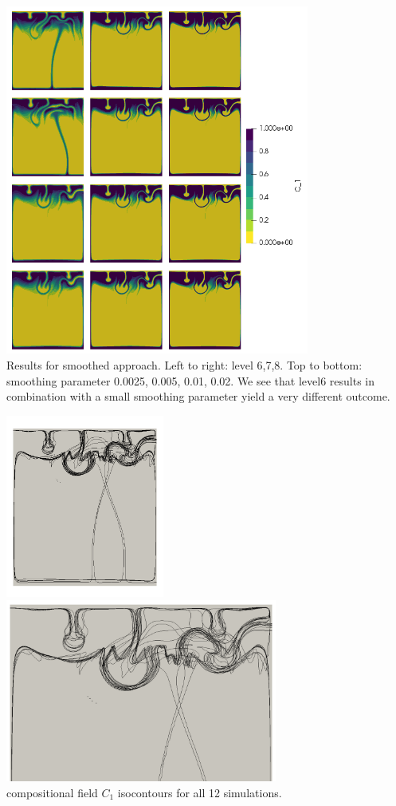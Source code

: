 \begin{itemize}
\begin{center}
\includegraphics[width=10cm]{images/benchmark_vaks97/aspect/C1}\\
{\captionfont Results for smoothed approach. Left to right: level 6,7,8. Top to bottom: smoothing 
parameter 0.0025, 0.005, 0.01, 0.02. We see that level6 results in combination with a small smoothing parameter
yield a very different outcome.}
\end{center}

\begin{center}
\includegraphics[height=6cm]{images/benchmark_vaks97/aspect/contours_678}
\includegraphics[height=6cm]{images/benchmark_vaks97/aspect/contours_678zoom}\\
{ compositional field $C_1$ isocontours for all 12 simulations.} 
\end{center}


\end{itemize}

